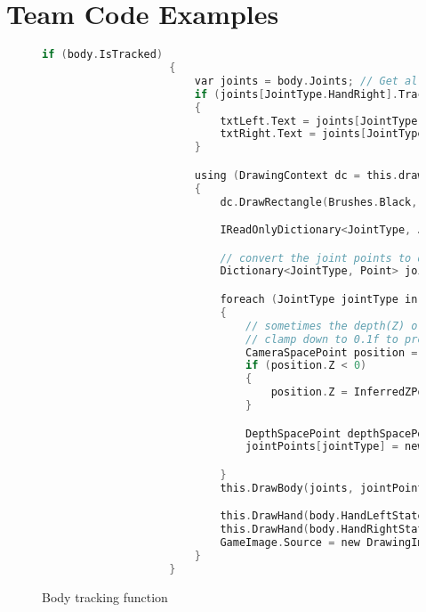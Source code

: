 \documentclass[onecolumn, draftclsnofoot,10pt, compsoc]{IEEEtran}
\begin{document}
\section{Team Code Examples}
\begin{figure}[H]
\begin{lstlisting}[language=C, style=customc]
if (body.IsTracked)
                    {
                        var joints = body.Joints; // Get all of the joints in that body
                        if (joints[JointType.HandRight].TrackingState == TrackingState.Tracked && joints[JointType.HandLeft].TrackingState == TrackingState.Tracked)
                        {
                            txtLeft.Text = joints[JointType.HandLeft].Position.Y.ToString();
                            txtRight.Text = joints[JointType.HandRight].Position.Y.ToString();
                        }

                        using (DrawingContext dc = this.drawingGroup.Open())
                        {
                            dc.DrawRectangle(Brushes.Black, null, new Rect(0.0, 0.0, this.displayWidth, this.displayHeight));

                            IReadOnlyDictionary<JointType, Joint> jointsD = body.Joints;

                            // convert the joint points to depth (display) space
                            Dictionary<JointType, Point> jointPoints = new Dictionary<JointType, Point>();

                            foreach (JointType jointType in jointsD.Keys)
                            {
                                // sometimes the depth(Z) of an inferred joint may show as negative
                                // clamp down to 0.1f to prevent coordinatemapper from returning (-Infinity, -Infinity)
                                CameraSpacePoint position = jointsD[jointType].Position;
                                if (position.Z < 0)
                                {
                                    position.Z = InferredZPositionClamp;
                                }

                                DepthSpacePoint depthSpacePoint = this.coordinateMapper.MapCameraPointToDepthSpace(position);
                                jointPoints[jointType] = new Point(depthSpacePoint.X, depthSpacePoint.Y);

                            }
                            this.DrawBody(joints, jointPoints, dc, drawPen);

                            this.DrawHand(body.HandLeftState, jointPoints[JointType.HandLeft], dc);
                            this.DrawHand(body.HandRightState, jointPoints[JointType.HandRight], dc);
                            GameImage.Source = new DrawingImage(drawingGroup);
                        }
                    }

\end{lstlisting}
\caption{Body tracking function}
\end{figure}
\end{document}
